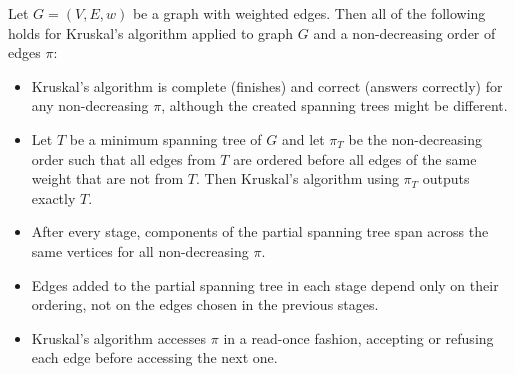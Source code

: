 \begin{fact}\label{fact:kruskal}
Let $G = (V,E,w)$ be a graph with weighted edges. Then all of the following holds for Kruskal's algorithm applied to graph $G$ and a non-decreasing order of edges $\pi$: 
\begin{itemize}
    \item Kruskal's algorithm is complete (finishes) and correct (answers correctly) for any non-decreasing $\pi$, although the created spanning trees might be different. 
    \item Let $T$ be a minimum spanning tree of $G$ and let $\pi_T$ be the non-decreasing order such that all edges from $T$ are ordered before all edges of the same weight that are not from $T$. Then Kruskal's algorithm using $\pi_T$ outputs exactly $T$. 
    \item After every stage, components of the partial spanning tree span across the same vertices for all non-decreasing $\pi$. 
    \item Edges added to the partial spanning tree in each stage depend only on their ordering, not on the edges chosen in the previous stages. 
    \item Kruskal's algorithm accesses $\pi$ in a read-once fashion, accepting or refusing each edge before accessing the next one. 
\end{itemize}
\end{fact}